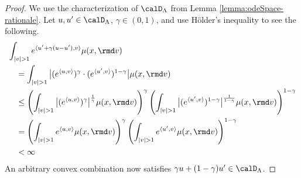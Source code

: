 \begin{proof}
  \label{proof:lemma:odeSpace-convex}
  We use the characterization of $\odeSpace$ from Lemma \ref{lemma:odeSpace-rationale}.
  Let $\momentVar, \momentVar' \in \odeSpace$, $\gamma \in (0,1)$, and use H\"older's inequality to see the following.
  \begin{align*}
    &\int_{|\markVar|>1} e^\prj{\momentVar' + \gamma(\momentVar-\momentVar')}{\markVar} \affJump(\stateVar,\rmd\markVar) \\
    &\quad= \int_{|\markVar|>1} \big| (e^\prj{\momentVar}{\markVar})^\gamma \cdot (e^\prj{\momentVar'}{\markVar})^{1-\gamma} \big| \affJump(\stateVar,\rmd\markVar) \\
    &\quad\leq \left( \int_{|\markVar|>1} \big| (e^\prj{\momentVar}{\markVar})^\gamma \big|^{\frac{1}{\gamma}} \affJump(\stateVar, \rmd\markVar) \right)^\gamma \left( \int_{|\markVar|>1} \big| (e^\prj{\momentVar'}{\markVar})^{1-\gamma} \big|^{\frac{1}{1-\gamma}} \affJump(\stateVar,\rmd\markVar)\right)^{1-\gamma} \\
    &\quad= \left( \int_{|\markVar|>1} e^\prj{\momentVar}{\markVar} \affJump(\stateVar, \rmd\markVar) \right)^\gamma \left( \int_{|\markVar|>1}  e^\prj{\momentVar'}{\markVar} \affJump(\stateVar,\rmd\markVar)\right)^{1-\gamma} \\
    &\quad<\infty
  \end{align*}
  An arbitrary convex combination now satisfies $\gamma\momentVar+(1-\gamma)\momentVar' \in \odeSpace$.
\end{proof}
